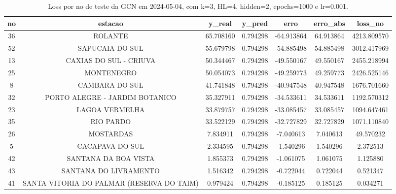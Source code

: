 \begin{table}[h]
\centering
\caption{Loss por no de teste da GCN em 2024-05-04, com k=3, HL=4, hidden=2, epochs=1000 e lr=0.001.}
\label{tab:gcn_loss_k3_hl4_h2_e1000_d20240504}
\begin{tabular}{ccccccc}
\toprule
no & estacao & y\_real & y\_pred & erro & erro\_abs & loss\_no \\
\midrule
36 & ROLANTE & 65.708160 & 0.794298 & -64.913864 & 64.913864 & 4213.809570 \\
52 & SAPUCAIA DO SUL & 55.679798 & 0.794298 & -54.885498 & 54.885498 & 3012.417969 \\
13 & CAXIAS DO SUL - CRIUVA & 50.344467 & 0.794298 & -49.550167 & 49.550167 & 2455.218994 \\
25 & MONTENEGRO & 50.054073 & 0.794298 & -49.259773 & 49.259773 & 2426.525146 \\
8 & CAMBARA DO SUL & 41.741848 & 0.794298 & -40.947548 & 40.947548 & 1676.701660 \\
32 & PORTO ALEGRE - JARDIM BOTANICO & 35.327911 & 0.794298 & -34.533611 & 34.533611 & 1192.570312 \\
23 & LAGOA VERMELHA & 33.879757 & 0.794298 & -33.085457 & 33.085457 & 1094.647461 \\
35 & RIO PARDO & 33.522129 & 0.794298 & -32.727829 & 32.727829 & 1071.110840 \\
26 & MOSTARDAS & 7.834911 & 0.794298 & -7.040613 & 7.040613 & 49.570232 \\
5 & CACAPAVA DO SUL & 2.334595 & 0.794298 & -1.540296 & 1.540296 & 2.372513 \\
42 & SANTANA DA BOA VISTA & 1.855373 & 0.794298 & -1.061075 & 1.061075 & 1.125880 \\
43 & SANTANA DO LIVRAMENTO & 1.516342 & 0.794298 & -0.722044 & 0.722044 & 0.521347 \\
41 & SANTA VITORIA DO PALMAR (RESERVA DO TAIM) & 0.979424 & 0.794298 & -0.185125 & 0.185125 & 0.034271 \\
\bottomrule
\end{tabular}
\end{table}
